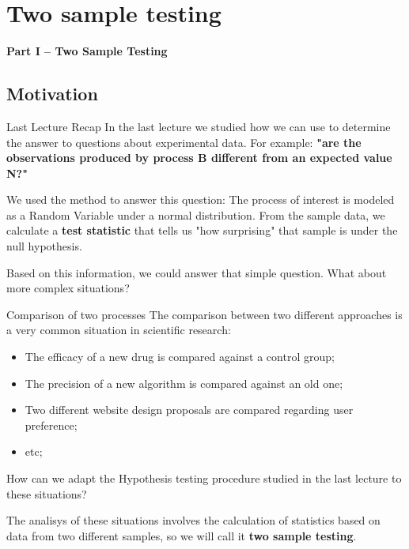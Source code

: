 \section{Two sample testing}

\begin{frame}
  \begin{center}
    {\bf Part I -- Two Sample Testing}
  \end{center}
\end{frame}

\subsection{Motivation}

\begin{frame}{Last Lecture Recap}
  In the last lecture we studied how we can use  to determine the answer to questions about experimental data. For example: {\bf "are the observations produced by process B different from an expected value N?"}\bigskip

  We used the  method to answer this question:
  The process of interest is modeled as a Random Variable under a normal distribution. From the sample data, we calculate a {\bf test statistic} that tells us "how surprising" that sample is under the null hypothesis.\bigskip

  Based on this information, we could answer that simple question. What about more complex situations?
\end{frame}


\begin{frame}{Comparison of two processes}
  The comparison between two different approaches is a very common situation in scientific research:\bigskip

  \begin{itemize}
    \item The efficacy of a new drug is compared against a control group;

    \item The precision of a new algorithm is compared against an old one;

    \item Two different website design proposals are compared regarding user preference;

    \item etc;
  \end{itemize}
  \bigskip

  How can we adapt the Hypothesis testing procedure studied in the last lecture to these situations?\bigskip

  The analisys of these situations involves the calculation of statistics based on data from two different samples, so we will call it {\bf two sample testing}.
\end{frame}


